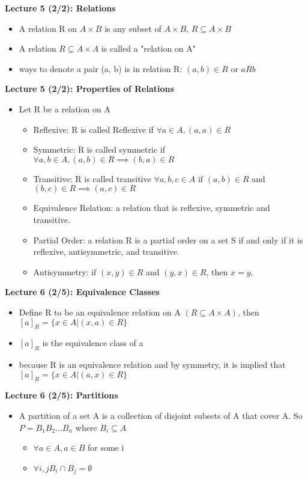 \documentclass[twocolumn]{article}
\begin{document}
\textbf{Lecture 5 (2/2): Relations}
\begin{itemize}
    \item A relation R on $A \times B$ is any subset of $A \times B$, $R \subseteq A \times B$ 
    \item A relation $R \subseteq A \times A$ is called a "relation on A"
    \item ways to denote a pair (a, b) is in relation R: $(a, b) \in R$ or $aRb$
\end{itemize}

\textbf{Lecture 5 (2/2): Properties of Relations}
\begin{itemize}
    \item Let R be a relation on A
    \begin{itemize}
        \item Reflexive: R is called Reflexive if $\forall a \in A, (a, a) \in R$
        \item Symmetric: R is called symmetric if $\forall a, b \in A, (a, b) \in R \implies (b, a) \in R$
        \item Transitive: R is called transitive $\forall a, b, c \in A$ if $(a, b) \in R$ and $(b, c) \in R \implies (a,c) \in R$
        \item Equivalence Relation: a relation that is reflexive, symmetric and transitive.
        \item Partial Order: a relation R is a partial order on a set S if and only if it is reflexive, antisymmetric, and transitive.
        \item Antisymmetry: if $(x, y) \in R$ and $(y, x) \in R$, then $x=y$.
    \end{itemize}
\end{itemize}

\textbf{Lecture 6 (2/5): Equivalence Classes}
\begin{itemize}
    \item Define R to be an equivalence relation on A $(R \subseteq A \times A)$, then $[a]_R = \{ x \in A | (x, a) \in R\}$
    \item $[a]_R$ is the equivalence class of a
    \item because R is an equivalence relation and by symmetry, it is implied that $[a]_R = \{ x \in A | (a, x) \in R\}$
\end{itemize}

\textbf{Lecture 6 (2/5): Partitions}
\begin{itemize}
    \item A partition of a set A is a collection of disjoint subsets of A that cover A. So $P = B_1B_2...B_n$ where $B_i\subseteq A$
    \begin{itemize}
        \item $\forall a \in A, a \in B$ for some i
        \item $\forall i, jB_i \cap B_j = \emptyset$
    \end{itemize}
\end{itemize}
\end{document}
